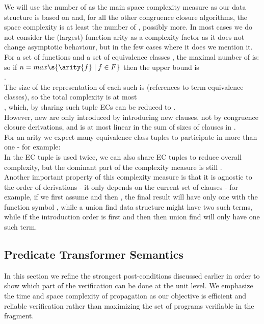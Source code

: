 We will use the number of \GFAECSet as the main space complexity measure as our data structure is based on \GFAECSet and, for all the other congruence closure algorithms, the space complexity is at least the number of \GFAECSet, possibly more.
In most cases we do not consider the (largest) function arity as a complexity factor as it does not change asymptotic behaviour, 
but in the few cases where it does we mention it.\\
For a set of functions  and a set of equivalence classes , the maximal number of \GFAECSet is:\\
 so if $n=max\s{\arity{f} \mid f \in F}$ then the upper bound is \\
.\\
The size of the representation of each such \GFAEC {} is  (references to term equivalence classes), so the total complexity is at most \\ , which, by sharing such tuple ECs can be reduced to 
.\\
However, new \GFAECSet are only introduced by introducing new clauses, not by congruence closure derivations, and is at most linear in the sum of sizes of clauses in .\\
For an arity  we expect many equivalence class tuples to participate in more than one \GFAEC - for example:\\
In  the EC tuple  is used twice,
we can also share EC tuples to reduce overall complexity, but the dominant part of the complexity measure is still .\\
Another important property of this complexity measure is that it is agnostic to the order of derivations - it only depends on the current set of clauses - for example, if we first assume  and then , the final result will have only one \GFAEC with the function symbol , while a union find data structure might have two such terms, while if the introduction order is  
first  and then  then union find will only have one such term.



\newpage
\subsection{Predicate Transformer Semantics}
In this section we refine the strongest post-conditions discussed earlier in order to show which part of the verification can be done at the unit level. We emphasize the time and space complexity of propagation as our objective is efficient and reliable verification rather than maximizing the set of programs verifiable in the fragment.

